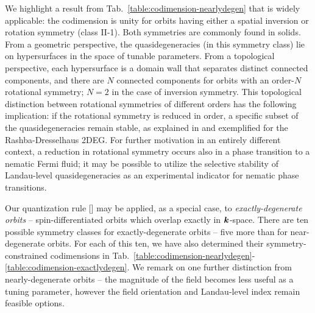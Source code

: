 \documentclass[aps, showpacs, twocolumn, notitlepage, superscriptaddress]{revtex4-1}
\begin{document}
We highlight a result from  Tab.\ \ref{table:codimension-nearlydegen} that is widely applicable: the codimension is unity for orbits having either a spatial inversion or rotation symmetry (class II-1). Both symmetries are commonly found in solids. From a geometric perspective, the quasidegeneracies (in this symmetry class) lie on hypersurfaces in the space of tunable parameters. From a topological perspective, each hypersurface is a domain wall that separates distinct connected components, and there are $N$ connected components for orbits with an order-$N$ rotational symmetry; $N=2$ in the case of inversion symmetry. This topological distinction between rotational symmetries of different orders has the following implication: if the rotational symmetry is reduced in order, a specific subset of the quasidegeneracies remain stable, as explained in  and exemplified for the Rashba-Dresselhaus 2DEG.  For further motivation in an entirely different context, a reduction in rotational symmetry   occurs also in a phase transition to a nematic Fermi fluid\cite{fradkin_nematic_2010}; it may be possible to utilize  the selective stability of Landau-level quasidegeneracies as an experimental indicator for nematic phase transitions. 

Our quantization rule [] may be applied, as a special case, to \textit{exactly-degenerate orbits} -- spin-differentiated orbits which overlap exactly in $\boldsymbol{k}$-space. There are ten possible symmetry classes for exactly-degenerate orbits -- five more than for near-degenerate orbits. For each of this ten, we have also determined their symmetry-constrained codimensions in Tab.\ \ref{table:codimension-nearlydegen}-\ref{table:codimension-exactlydegen}. We remark on one further distinction from nearly-degenerate orbits --  the magnitude of the field becomes less useful as a tuning parameter, however the field orientation and Landau-level index remain feasible options.

\end{document}

